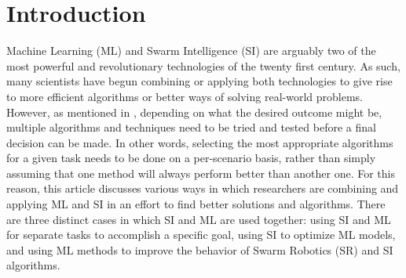 \documentclass[twocolumn]{bmcart}%
\begin{document}
\begin{frontmatter}
\begin{fmbox}
\begin{abstractbox}
\begin{keyword}
\end{keyword}


\end{abstractbox}
%
\end{fmbox}%

\end{frontmatter}


\section*{Introduction}
Machine Learning (ML) and Swarm Intelligence (SI) are arguably two of the most powerful and revolutionary technologies of the twenty first century. As such, many scientists have begun combining or applying both technologies to give rise to more efficient algorithms or better ways of solving real-world problems. However, as mentioned in \cite{James}, depending on what the desired outcome might be, multiple algorithms and techniques need to be tried and tested before a final decision can be made. In other words, selecting the most appropriate algorithms for a given task needs to be done on a per-scenario basis, rather than simply assuming that one method will always perform better than another one. For this reason, this article discusses various ways in which researchers are combining and applying ML and SI in an effort to find better solutions and algorithms. There are three distinct cases in which SI and ML are used together: using SI and ML for separate tasks to accomplish a specific goal, using SI to optimize ML models, and using ML methods to improve the behavior of Swarm Robotics (SR) and SI algorithms. 
\end{document}
